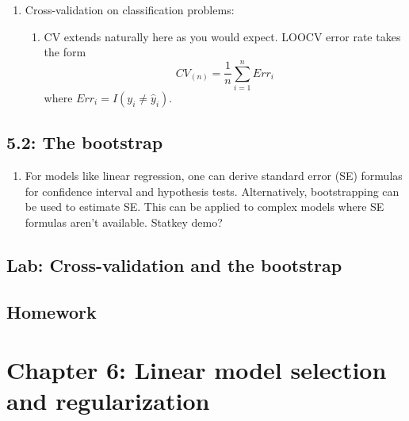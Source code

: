 \documentclass{article}
\begin{document}
\begin{enumerate}
\item Cross-validation on classification problems:
\begin{enumerate}
\item CV extends naturally here as you would expect. LOOCV error rate takes the form
\[
CV_{(n)} = \frac{1}{n} \sum_{i=1}^n Err_i
\]
where $Err_i = I(y_i \neq \hat{y}_i)$.
\end{enumerate}

\end{enumerate}

\subsection*{5.2: The bootstrap}

\begin{enumerate}
\item For models like linear regression, one can derive standard error (SE) formulas for confidence interval and hypothesis tests. Alternatively, bootstrapping can be used to estimate SE. This can be applied to complex models where SE formulas aren't available. Statkey demo?

\end{enumerate}

\subsection*{Lab: Cross-validation and the bootstrap}

\subsection*{Homework}

\section*{Chapter 6: Linear model selection and regularization} 
\end{document}

